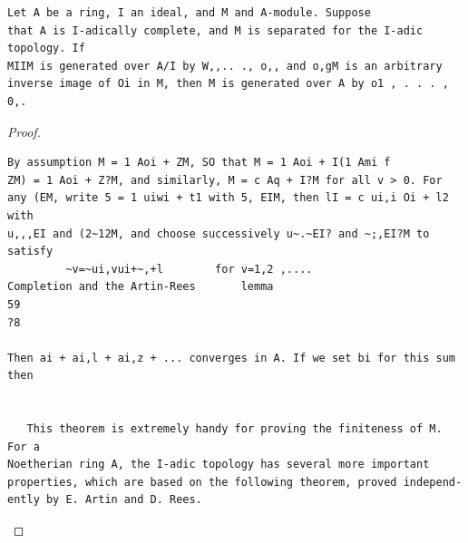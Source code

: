 \begin{theorem}\label{mcrt-auto-theorem-8-4}\uses{}
\begin{verbatim}
Let A be a ring, I an ideal, and M and A-module. Suppose
that A is I-adically complete, and M is separated for the I-adic topology. If
MIIM is generated over A/I by W,,.. ., o,, and o,gM is an arbitrary
inverse image of Oi in M, then M is generated over A by o1 , . . . , 0,.
\end{verbatim}
\end{theorem}
\begin{proof}
\begin{verbatim}
By assumption M = 1 Aoi + ZM, SO that M = 1 Aoi + I(1 Ami f
ZM) = 1 Aoi + Z?M, and similarly, M = c Aq + I?M for all v > 0. For
any (EM, write 5 = 1 uiwi + t1 with 5, EIM, then lI = c ui,i Oi + l2 with
u,,,EI and (2~12M, and choose successively u~.~EI? and ~;,EI?M to satisfy
         ~v=~ui,vui+~,+l        for v=1,2 ,....
Completion and the Artin-Rees       lemma                            59
?8

Then ai + ai,l + ai,z + ... converges in A. If we set bi for this sum then


   This theorem is extremely handy for proving the finiteness of M. For a
Noetherian ring A, the I-adic topology has several more important
properties, which are based on the following theorem, proved independ-
ently by E. Artin and D. Rees.
\end{verbatim}
\end{proof}


